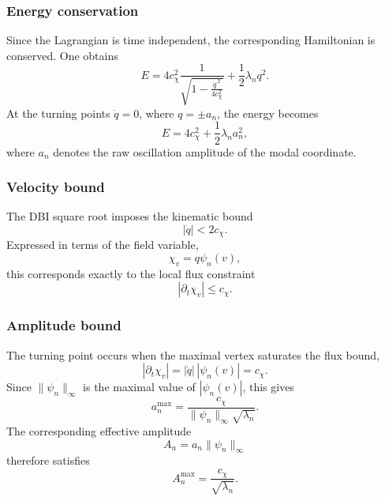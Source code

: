  \subsubsection*{Energy conservation}

    Since the Lagrangian is time independent, the corresponding Hamiltonian
    is conserved.
    One obtains
    \begin{equation}
      E
      =
      4c_\chi^2
      \frac{1}{\sqrt{1-\frac{\dot q^{\,2}}{4c_\chi^2}}}
      +
      \frac12\lambda_n q^2 .
    \end{equation}
    At the turning points $\dot q=0$, where $q=\pm a_n$, the energy becomes
    \begin{equation}
      E
      =
      4c_\chi^2
      +
      \frac12\lambda_n a_n^2 ,
    \end{equation}
    where $a_n$ denotes the raw oscillation amplitude of the modal coordinate.

  \subsubsection*{Velocity bound}

    The DBI square root imposes the kinematic bound
    \begin{equation}
      |\dot q| < 2c_\chi .
    \end{equation}
    Expressed in terms of the field variable,
    \[
      \chi_v = q\psi_n(v),
    \]
    this corresponds exactly to the local flux constraint
    \[
      |\partial_t \chi_v| \le c_\chi .
    \]

  \subsubsection*{Amplitude bound}

    The turning point occurs when the maximal vertex saturates the flux bound,
    \[
      |\partial_t\chi_v|
      =
      |\dot q|\,|\psi_n(v)|
      =
      c_\chi .
    \]
    Since $\|\psi_n\|_\infty$ is the maximal value of $|\psi_n(v)|$, this gives
    \begin{equation}
      a_n^{\max}
      =
      \frac{c_\chi}{\|\psi_n\|_\infty\sqrt{\lambda_n}} .
    \end{equation}
    The corresponding effective amplitude
    \[
      A_n = a_n\|\psi_n\|_\infty
    \]
    therefore satisfies
    \begin{equation}
      A_n^{\max}
      =
      \frac{c_\chi}{\sqrt{\lambda_n}} .
    \end{equation}

